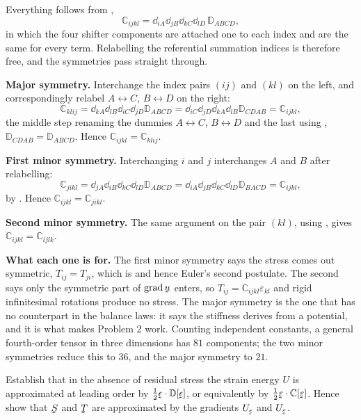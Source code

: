 \begin{solution}
Everything follows from ,
\[
   \mathbb{C}_{ijkl}=\dd_{iA}\dd_{jB}\dd_{kC}\dd_{lD}\,
   \mathbb{D}_{ABCD},
\]
in which the four shifter components are attached one to each index and
are the same for every term. Relabelling the referential summation
indices is therefore free, and the symmetries pass straight through.

\textbf{Major symmetry.} Interchange the index pairs $(ij)$ and $(kl)$
on the left, and correspondingly relabel $A\leftrightarrow C$,
$B\leftrightarrow D$ on the right:
\[
   \mathbb{C}_{klij}=\dd_{kA}\dd_{lB}\dd_{iC}\dd_{jD}\mathbb{D}_{ABCD}
   =\dd_{iC}\dd_{jD}\dd_{kA}\dd_{lB}\mathbb{D}_{CDAB}
   =\mathbb{C}_{ijkl},
\]
the middle step renaming the dummies $A\leftrightarrow C$,
$B\leftrightarrow D$ and the last using ,
$\mathbb{D}_{CDAB}=\mathbb{D}_{ABCD}$. Hence
$\boxed{\mathbb{C}_{ijkl}=\mathbb{C}_{klij}}$.

\textbf{First minor symmetry.} Interchanging $i$ and $j$ interchanges
$A$ and $B$ after relabelling:
\[
   \mathbb{C}_{jikl}=\dd_{jA}\dd_{iB}\dd_{kC}\dd_{lD}\mathbb{D}_{ABCD}
   =\dd_{iA}\dd_{jB}\dd_{kC}\dd_{lD}\mathbb{D}_{BACD}
   =\mathbb{C}_{ijkl},
\]
by . Hence $\boxed{\mathbb{C}_{ijkl}=\mathbb{C}_{jikl}}$.

\textbf{Second minor symmetry.} The same argument on the pair $(kl)$,
using , gives
$\boxed{\mathbb{C}_{ijkl}=\mathbb{C}_{ijlk}}$.

\textbf{What each one is for.} The first minor symmetry says the stress
comes out symmetric, $T_{ij}=T_{ji}$, which is  and hence
Euler's second postulate. The second says only the symmetric part of
$\grad\bu$ enters, so $T_{ij}=\mathbb{C}_{ijkl}\varepsilon_{kl}$ and
rigid infinitesimal rotations produce no stress. The major symmetry is
the one that has no counterpart in the balance laws: it says the
stiffness derives from a potential, and it is what makes Problem 2
work. Counting independent constants, a general fourth-order tensor in
three dimensions has $81$ components; the two minor symmetries reduce
this to $36$, and the major symmetry to $21$.
\end{solution}

\begin{problem}
Establish that in the absence of residual stress the strain energy $U$
is approximated at leading order by
$\tfrac12\vek{\epsilon}\cdot\mathbb{D}[\vek{\epsilon}]$, or equivalently
by $\tfrac12\vek{\varepsilon}\cdot\mathbb{C}[\vek{\varepsilon}]$. Hence
show that $\bS$ and $\bT$ are approximated by the gradients
$U_{\vek{\epsilon}}$ and $U_{\vek{\varepsilon}}$.
\end{problem}

